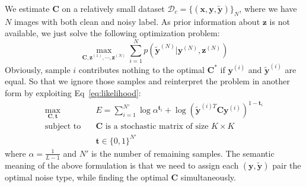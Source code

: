 \documentclass[10pt,twocolumn,letterpaper]{article}
\def\vec{\mathbf}
\def\mat{\mathbf}
\begin{document}
We estimate $\mat{C}$ on a relatively small dataset $\mathcal{D}_c = \{(\vec{x},\vec{y},\tilde{\vec{y}})\}_N$, where we have $N$ images with both clean and noisy label. As prior information about $\vec{z}$ is not available, we just solve the following optimization problem:
\begin{equation}
    \max_{\mat{C},\vec{z}^{(1)},\cdots,\vec{z}^{(N)}} \sum_{i=1}^N p(\tilde{\vec{y}}^{(N)}|\vec{y}^{(N)},\vec{z}^{(N)})
\end{equation}
Obviously, sample $i$ contributes nothing to the optimal $\mat{C}^*$ if $\vec{y}^{(i)}$ and $\tilde{\vec{y}}^{(i)}$ are equal. So that we ignore those samples and reinterpret the problem in another form by exploiting Eq~\ref{eq:likelihood}:
\begin{equation}
\begin{aligned}
\max_{\mat{C},\vec{t}} \quad & E=\sum_{i=1}^{N'} \log \alpha^{\vec{t}_i} + \log (\tilde{\vec{y}}^{(i)T} \mat{C} \vec{y}^{(i)})^{1-\vec{t}_i}\\
\text{subject to} \quad & \mat{C} \text{ is a stochastic matrix of size } K\times K \\
                    & \vec{t} \in \{0,1\}^{N'}
\end{aligned}
\end{equation}
where $\alpha=\frac{1}{L-1}$ and $N'$ is the number of remaining samples. The semantic meaning of the above formulation is that we need to assign each $(\vec{y},\tilde{\vec{y}})$ pair the optimal noise type, while finding the optimal $\mat{C}$ simultaneously.
\end{document}
